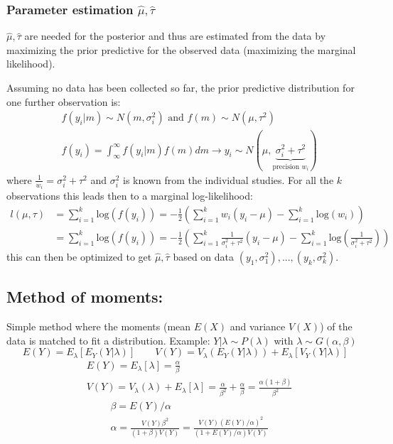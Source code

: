\documentclass{article}\usepackage[]{graphicx}\usepackage[]{xcolor}
\begin{document}
\begin{multicols*}{2}
\subsubsection{Parameter estimation $\hat{\mu},\hat{\tau}$}
$\hat{\mu},\hat{\tau}$ are needed for the posterior and thus are estimated from the data by maximizing the prior predictive for the observed data (maximizing the marginal likelihood). 

Assuming no data has been collected so far, the prior predictive distribution for one further observation is:
\begin{align*}
&f(y_i|m)\sim N(m,\sigma_i^2)\text{ and }f(m)\sim N(\mu,\tau^2)\\
&f(y_i)=\int_{\infty}^{\infty}f(y_i|m)f(m)dm\rightarrow y_i\sim N(\mu,\underbrace{\sigma_i^2+\tau^2}_{\text{precision }w_i})
\end{align*}
where $\frac{1}{w_i}=\sigma_i^2+\tau^2$ and $\sigma_i^2$ is known from the individual studies.
For all the $k$ observations this leads then to a marginal log-likelihood:
\begin{align*}
l(\mu,\tau)&=\sum_{i=1}^{k}\text{log}(f(y_i))=-\frac{1}{2}\left(\sum_{i=1}^{k}w_i(y_i-\mu)-\sum_{i=1}^{k}\text{log}(w_i)\right)\\
&=\sum_{i=1}^{k}\text{log}(f(y_i))=-\frac{1}{2}\left(\sum_{i=1}^{k}\frac{1}{\sigma_i^2+\tau^2}(y_i-\mu)-\sum_{i=1}^{k}\text{log}\left(\frac{1}{\sigma_i^2+\tau^2}\right)\right)
\end{align*}
this can then be optimized to get $\hat{\mu},\hat{\tau}$ based on data $(y_1,\sigma_1^2),...,(y_k,\sigma_k^2)$.
\subsection{Method of moments:}
Simple method where the moments (mean $E(X)$ and variance $V(X)$) of the data is matched to fit a distribution.
Example: $Y|\lambda\sim P(\lambda)$ with $\lambda\sim G(\alpha,\beta)$
$$
\boxed{E(Y)=E_{\lambda}[E_Y(Y|\lambda)]}\qquad\boxed{V(Y)=V_{\lambda}(E_Y(Y|\lambda))+E_{\lambda}[V_Y(Y|\lambda)]}
$$
\begin{align*}
&E(Y)=E_{\lambda}[\lambda]=\frac{\alpha}{\beta}\\
&V(Y)=V_{\lambda}(\lambda)+E_{\lambda}[\lambda]=\frac{\alpha}{\beta^2}+\frac{\alpha}{\beta}=\frac{\alpha(1+\beta)}{\beta^2}
\end{align*}
\begin{align*}
&\beta=E(Y)/\alpha\\
&\alpha=\frac{V(Y)\beta^2}{(1+\beta)V(Y)}=\frac{V(Y)(E(Y)/\alpha)^2}{(1+E(Y)/\alpha)V(Y)}
\end{align*}



\end{multicols*}
\end{document}
